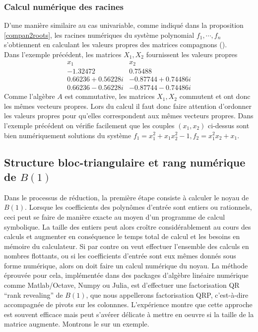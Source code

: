\documentclass{standalone}
\begin{document}
\subsubsection{Calcul numérique des racines}
D'une manière similaire au cas univariable, comme indiqué dans la proposition \ref{compan2roots}, les racines numériques du système polynomial $f_1, \cdots, f_n$ s'obtiennent en calculant les valeurs propres des matrices compagnons (\cite{AS}).\\
Dans l'exemple précédent, les matrices $X_1, X_2$ fournissent les valeurs propres
$$
\begin{array}{c|c}
	x_1 & x_2 \\
	\hline
	-1.32472  & 0.75488 \\
	0.66236 + 0.56228i & -0.87744 + 0.74486i \\
	0.66236 - 0.56228i & -0.87744 - 0.74486i
\end{array}
$$
Comme l'algèbre $A$ est commutative, les matrices $X_1, X_2$ commutent et ont donc les mêmes vecteurs propres. Lors du calcul il faut donc faire attention d'ordonner les valeurs propres pour qu'elles correspondent aux mêmes vecteurs propres.
Dans l'exemple précédent on vérifie facilement que les couples $(x_1, x_2)$ ci-dessus sont bien numériquement solutions du système $f_1 = x_1^2 + x_1x_2^2 - 1, f_2 = x_1^2x_2 + x_1$.

\subsection{Structure bloc-triangulaire et rang numérique de $B(1)$}
Dans le processus de réduction, la première étape consiste à calculer le noyau de $B(1)$. Lorsque les coefficients des polynômes d'entrée sont entiers ou rationnels, ceci peut se faire de manière exacte au moyen d'un programme de calcul symbolique. La taille des entiers peut alors croître considérablement au cours des calculs et augmenter en conséquence le temps total de calcul et les besoins en mémoire du calculateur. Si par contre on veut effectuer l'ensemble des calculs en nombres flottants, ou si les coefficients d'entrée sont eux mêmes donnés sous forme numérique, alors on doit faire un calcul numérique du noyau.
La méthode éprouvée pour cela, implémentée dans des packages d'algèbre linéaire numérique comme Matlab/Octave, Numpy ou Julia, est d'effectuer une factorisation QR ``rank revealing'' de $B(1)$, que nous appellerons factorisation QRP, c'est-à-dire accompagnée de pivots sur les colonnnes. L'expérience montre que cette approche est souvent efficace mais peut s'avérer délicate à mettre en oeuvre si la taille de la matrice augmente. Montrons le sur un exemple.
\end{document}
